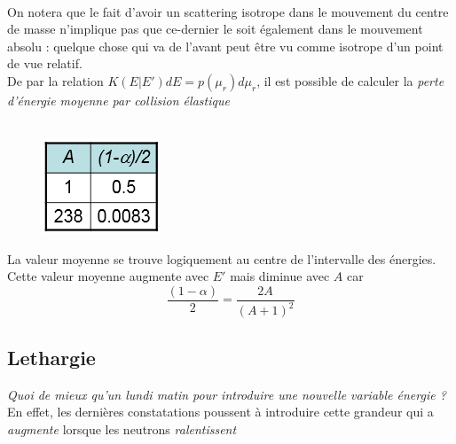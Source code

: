 	\ \\
	
	On notera que le fait d'avoir un scattering isotrope dans le mouvement du centre de masse 
	n'implique pas que ce-dernier le soit également dans le mouvement absolu : quelque chose qui 
	va de l'avant peut être vu comme isotrope d'un point de vue relatif.\\
	
	De par la relation $K(E|E')dE = p({\mu _r})d{\mu _r}$, il est possible de calculer la \textit{
	perte d'énergie moyenne par collision élastique}\\
	
	\ \\
	
	\begin{figure}
	\vspace{-5mm}
	\includegraphics[scale=0.7]{ch7/image3.png}
	\end{figure}
	La valeur moyenne se trouve logiquement au centre de l'intervalle des énergies. Cette valeur 
	moyenne augmente avec $E'$ mais diminue avec $A$ car 
	\begin{equation}
	\frac{{(1 - \alpha )}}{2} = \frac{{2A}}{{{{(A + 1)}^2}}}
	\end{equation}

\newpage

	\subsection{Lethargie}
	\textit{Quoi de mieux qu'un lundi matin pour introduire une nouvelle variable énergie ?} En 
	effet, les dernières constatations poussent à introduire cette grandeur qui a \textit{augmente} 
	lorsque les neutrons \textit{ralentissent}\ \\
	
